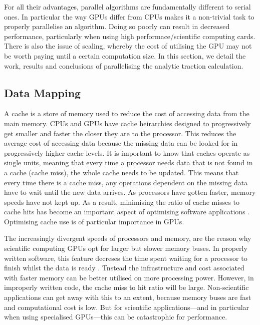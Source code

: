 For all their advantages, parallel algorithms are fundamentally different to serial ones. In particular the way GPUs differ from CPUs makes it a non-trivial task to properly parallelise an algorithm. Doing so poorly can result in decreased performance, particularly when using high performace/scientific computing cards. There is also the issue of scaling, whereby the cost of utilising the GPU may not be worth paying until a certain computation size. In this section, we detail the work, results and conclusions of parallelising the analytic traction calculation.

\subsection{Data Mapping}

A cache is a store of memory used to reduce the cost of accessing data from the main memory. CPUs and GPUs have cache heirarchies designed to progressively get smaller and faster the closer they are to the processor. This reduces the average cost of accessing data because the missing data can be looked for in progressively higher cache levels. It is important to know that caches operate as single units, meaning that every time a processor needs data that is not found in a cache (cache miss), the whole cache needs to be updated. This means that every time there is a cache miss, any operations dependent on the missing data have to wait until the new data arrives. As processors have gotten faster, memory speeds have not kept up. As a result, minimising the ratio of cache misses to cache hits has become an important aspect of optimising software applications \cite{cpuMemDiv,gpuMemDiv}. Optimising cache use is of particular importance in GPUs.

The increasingly divergent speeds of processors and memory, are the reason why scientific computing GPUs opt for larger but slower memory buses. In properly written software, this feature decreses the time spent waiting for a processor to finish whilst the data is ready \cite{gpuCache,sharedCache,gpuMemDiv2}. Tnstead the infrastructure and cost associated with faster memory can be better utilised on more processing power. However, in improperly written code, the cache miss to hit ratio will be large. Non-scientific applications can get away with this to an extent, because memory buses are fast and computational cost is low. But for scientific applications---and in particular when using specialised GPUs---this can be catastrophic for performance.

